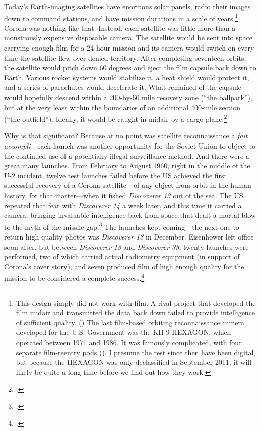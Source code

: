 \documentclass[14pt]{extarticle}
\begin{document}
Today's Earth-imaging satellites have enormous solar panels, radio their images down to command stations, and have mission durations in a scale of years.\footnote{This design simply did not work with film. A rival project that developed the film midair and transmitted the data back down failed to provide intelligence of sufficient quality. (\cite[p.~203-204]{brugioni_eyes_2010}) The last film-based orbiting reconnaissance camera developed for the U.S. Government was the KH-9 HEXAGON, which operated between 1971 and 1986. It was famously complicated, with four separate film-reentry pods (\cite{pressel_spy_2013}). I presume the rest since then have been digital, but because the HEXAGON was only declassified in September 2011, it will likely be quite a long time before we find out how they work.} Corona was nothing like that. Instead, each satellite was little more than a monstrously expensive disposable camera. The satellite would be sent into space carrying enough film for a 24-hour mission and its camera would switch on every time the satellite flew over denied territory. After completing seventeen orbits, the satellite would pitch down 60 degrees and eject the film capsule back down to Earth. Various rocket systems would stabilize it, a heat shield would protect it, and a series of parachutes would decelerate it. What remained of the capsule would hopefully descend within a 200-by-60 mile recovery zone (``the ballpark''), but at the very least within the boundaries of an additional 400-mile section (``the outfield''). Ideally, it would be caught in midair by a cargo plane.\footcite[p.~56]{peebles_corona_1997}

Why is that significant? Because at no point was satellite reconnaissance a \emph{fait accompli}---each launch was another opportunity for the Soviet Union to object to the continued use of a potentially illegal surveillance method. And there were a great many launches. From February to August 1960, right in the middle of the U-2 incident, twelve test launches failed before the US achieved the first successful recovery of a Corona satellite---of any object from orbit in the human history, for that matter---when it fished \emph{Discoverer 13} out of the sea. The US repeated that feat with \emph{Discoverer 14} a week later, and this time it carried a camera, bringing invaluable intelligence back from space that dealt a mortal blow to the myth of the missile gap.\footcite[p.~101-102. The previous failures had been so demoralizing that \emph{Discoverer 13} only carried diagnostic equipment, which made its success all the more exciting. Ships on standby were able to retrieve the satellite even though it fell outside the recovery zone---\emph{Discoverer 13} many not have landed in the ballpark or the outfield, but in many respects, the mission was a home run.]{lindgren_trust_2000} The launches kept coming---the next one to return high quality photos was \emph{Discoverer 18} in December. Eisenhower left office soon after, but between \emph{Discoverer 18} and \emph{Discoverer 38}, twenty launches were performed, two of which carried actual radiometry equipment (in support of Corona's cover story), and seven produced film of high enough quality for the mission to be considered a complete success.\footcite[p.~103]{lindgren_trust_2000}
\end{document}
